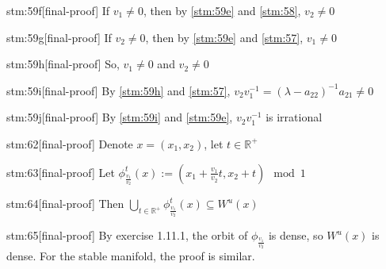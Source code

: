 \documentclass{article}
\begin{document}
\begin{stm}{stm:59f}[final-proof]
If $v_1 \ne 0$, then by \ref{stm:59e} and \ref{stm:58}, $v_2 \ne 0$
\end{stm}

\begin{stm}{stm:59g}[final-proof]
If $v_2 \ne 0$, then by \ref{stm:59e} and \ref{stm:57}, $v_1 \ne 0$
\end{stm}

\begin{stm}{stm:59h}[final-proof]
So, $v_1 \ne 0$ and $v_2 \ne 0$
\end{stm}

\begin{stm}{stm:59i}[final-proof]
By \ref{stm:59h} and \ref{stm:57}, $v_2 v_1^{-1} = (\lambda - a_{22})^{-1} a_{21} \ne 0$
\end{stm}

\begin{stm}{stm:59j}[final-proof]
By \ref{stm:59i} and \ref{stm:59e}, $v_2 v_1^{-1}$ is irrational
\end{stm}

\begin{stm}{stm:62}[final-proof]
Denote $x = (x_1, x_2)$, let $t \in \mathbb{R}^+$
\end{stm}

\begin{stm}{stm:63}[final-proof]
Let $\phi_{\frac{v_1}{v_2}}^t(x) := (x_1 + \frac{v_1}{v_2} t, x_2 + t) \mod 1$
\end{stm}

\begin{stm}{stm:64}[final-proof]
Then $\bigcup_{t \in \mathbb{R}^+} \phi_{\frac{v_1}{v_2}}^t(x) \subseteq W^u(x)$
\end{stm}

\begin{stm}{stm:65}[final-proof]
By exercise 1.11.1, the orbit of $\phi_{\frac{v_1}{v_2}}$ is dense, so $W^u(x)$ is dense. For the stable manifold, the proof is similar.
\end{stm}
\end{document}
